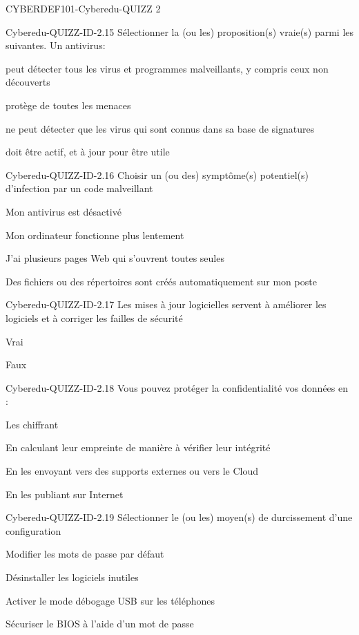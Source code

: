 \documentclass[12pt]{article}
\begin{document}
\begin{quiz}{CYBERDEF101-Cyberedu-QUIZZ 2}
\begin{multi}[multiple=true]{Cyberedu-QUIZZ-ID-2.15}
	S\'electionner la (ou les) proposition(s) vraie(s) parmi les suivantes. Un antivirus:
\item peut d\'etecter tous les virus et programmes malveillants, y compris ceux non d\'ecouverts
\item prot\`ege de toutes les menaces
\item* ne peut d\'etecter que les virus qui sont connus dans sa base de signatures
\item* doit \^etre actif, et \`{a} jour pour \^etre utile
\end{multi}

\begin{multi}[multiple=true]{Cyberedu-QUIZZ-ID-2.16}
	Choisir un (ou des) sympt\^ome(s) potentiel(s) d'infection par un code malveillant
\item* Mon antivirus est d\'esactiv\'e
\item* Mon ordinateur fonctionne plus lentement
\item  J'ai plusieurs pages Web  qui s'ouvrent toutes seules
\item Des fichiers ou des r\'epertoires sont cr\'e\'es automatiquement sur mon poste
\end{multi}

\begin{multi}[multiple=true]{Cyberedu-QUIZZ-ID-2.17}
	Les mises \`{a} jour logicielles servent \`{a} am\'eliorer les logiciels et \`{a} corriger les failles de s\'ecurit\'e
\item* Vrai
\item Faux
\end{multi}

\begin{multi}[multiple=true]{Cyberedu-QUIZZ-ID-2.18}
	Vous pouvez prot\'eger la confidentialit\'e vos donn\'ees en :
\item* Les chiffrant
\item En calculant leur empreinte de mani\`ere \`{a} v\'erifier leur int\'egrit\'e
\item En les envoyant vers des supports externes ou vers le Cloud
\item En  les publiant sur Internet
\end{multi}

\begin{multi}[multiple=true]{Cyberedu-QUIZZ-ID-2.19}
	S\'electionner le (ou les) moyen(s) de durcissement d'une configuration
\item* Modifier les mots de passe par d\'efaut
\item* D\'esinstaller les logiciels inutiles
\item Activer le mode  d\'ebogage USB  sur les t\'el\'ephones
\item* S\'ecuriser le BIOS \`{a} l'aide d'un mot de passe
\end{multi}


\end{quiz}
\end{document}
